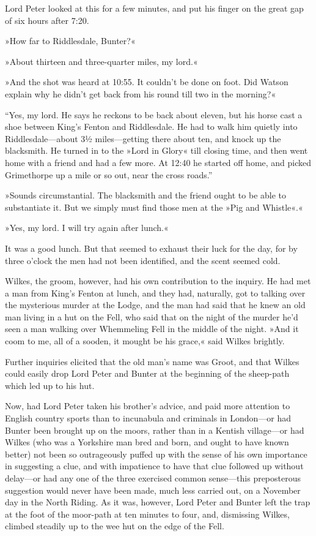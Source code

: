 Lord Peter looked at this for a few minutes, and put his finger on the great gap of six hours after 7:20.

»How far to Riddlesdale, Bunter?«

»About thirteen and three-quarter miles, my lord.«

»And the shot was heard at 10:55. It couldn't be done on foot. Did Watson explain why he didn't get back from his round till two in the morning?«

\enquote{Yes, my lord. He says he reckons to be back about eleven, but his horse cast a shoe between King's Fenton and Riddlesdale. He had to walk him quietly into Riddlesdale\allowbreak---\allowbreak about 3½ miles\allowbreak---\allowbreak getting there about ten, and knock up the blacksmith. He turned in to the »Lord in Glory« till closing time, and then went home with a friend and had a few more. At 12:40 he started off home, and picked Grimethorpe up a mile or so out, near the cross roads.}

»Sounds circumstantial. The blacksmith and the friend ought to be able to substantiate it. But we simply must find those men at the »Pig and Whistle«.«

»Yes, my lord. I will try again after lunch.«

It was a good lunch. But that seemed to exhaust their luck for the day, for by three o'clock the men had not been identified, and the scent seemed cold.

Wilkes, the groom, however, had his own contribution to the inquiry. He had met a man from King's Fenton at lunch, and they had, naturally, got to talking over the mysterious murder at the Lodge, and the man had said that he knew an old man living in a hut on the Fell, who said that on the night of the murder he'd seen a man walking over Whemmeling Fell in the middle of the night. »And it coom to me, all of a sooden, it mought be his grace,« said Wilkes brightly.

Further inquiries elicited that the old man's name was Groot, and that Wilkes could easily drop Lord Peter and Bunter at the beginning of the sheep-path which led up to his hut.

Now, had Lord Peter taken his brother's advice, and paid more attention to English country sports than to incunabula and criminals in London\allowbreak---\allowbreak or had Bunter been brought up on the moors, rather than in a Kentish village\allowbreak---\allowbreak or had Wilkes (who was a Yorkshire man bred and born, and ought to have known better) not been so outrageously puffed up with the sense of his own importance in suggesting a clue, and with impatience to have that clue followed up without delay\allowbreak---\allowbreak or had any one of the three exercised common sense\allowbreak---\allowbreak this preposterous suggestion would never have been made, much less carried out, on a November day in the North Riding. As it was, however, Lord Peter and Bunter left the trap at the foot of the moor-path at ten minutes to four, and, dismissing Wilkes, climbed steadily up to the wee hut on the edge of the Fell.

